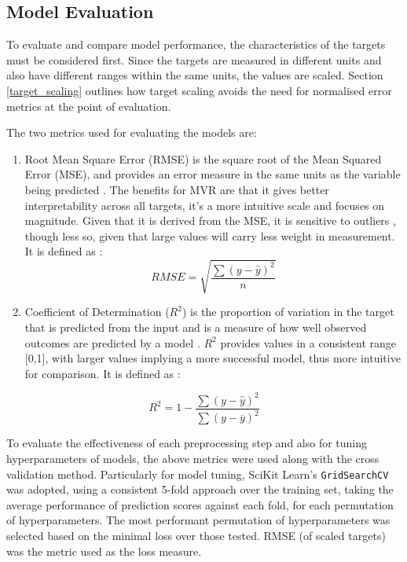 \documentclass[conference]{IEEEtran}
\begin{document}
\subsection{Model Evaluation}\label{Model Evaluation}
To evaluate and compare model performance, the characteristics of the targets must be considered first. Since the targets are measured in different units and also have different ranges within the same units, the values are scaled. Section \ref{target_scaling} outlines how target scaling avoids the need for normalised error metrics at the point of evaluation. 

The two metrics used for evaluating the models are:
\begin{enumerate}
    \item Root Mean Square Error (RMSE) is the square root of the Mean Squared Error (MSE), and provides an error measure in the same units as the variable being predicted \cite{plevris2022investigation}. The benefits for MVR are that it gives better interpretability across all targets, it's a more intuitive scale and focuses on magnitude. Given that it is derived from the MSE, it is sensitive to outliers \cite{plevris2022investigation}, though less so, given that large values will carry less weight in measurement. It is defined as \cite{plevris2022investigation}:
\begin{equation}
    RMSE = \sqrt{\frac{\sum(y-\hat{y})^2}{n}} \label{eq1}
\end{equation}
    \item Coefficient of Determination ($R^2$) is the proportion of variation in the target that is predicted from the input and is a measure of how well observed outcomes are predicted by a model \cite{plevris2022investigation}. $R^2$ provides values in a consistent range [0,1], with larger values implying a more successful model, thus more intuitive for comparison. It is defined as \cite{plevris2022investigation}:
\end{enumerate}
\begin{equation}
    R^2 = 1- \frac{\sum(y-\hat{y})^2}{\sum(y-\overline{y})^2} \label{eq2}
\end{equation}  

To evaluate the effectiveness of each preprocessing step and also for tuning hyperparameters of models, the above metrics were used along with the cross validation method. Particularly for model tuning, SciKit Learn's \texttt{GridSearchCV} was adopted, using a consistent 5-fold approach over the training set, taking the average performance of prediction scores against each fold, for each permutation of hyperparameters. The most performant permutation of hyperparameters was selected based on the minimal loss over those tested. RMSE (of scaled targets) was the metric used as the loss measure.
\end{document}
